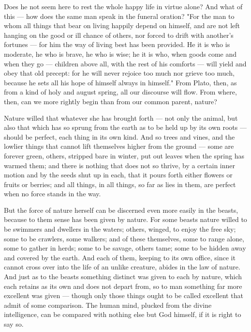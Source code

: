  Does he not seem here to rest the whole happy life in virtue alone? And what of this — how does the same man speak in the funeral oration? "For the man to whom all things that bear on living happily depend on himself, and are not left hanging on the good or ill chance of others, nor forced to drift with another's fortunes — for him the way of living best has been provided. He it is who is moderate, he who is brave, he who is wise; he it is who, when goods come and when they go — children above all, with the rest of his comforts — will yield and obey that old precept: for he will never rejoice too much nor grieve too much, because he sets all his hope of himself always in himself." From Plato, then, as from a kind of holy and august spring, all our discourse will flow. From where, then, can we more rightly begin than from our common parent, nature?

 Nature willed that whatever she has brought forth — not only the animal, but also that which has so sprung from the earth as to be held up by its own roots — should be perfect, each thing in its own kind. And so trees and vines, and the lowlier things that cannot lift themselves higher from the ground — some are forever green, others, stripped bare in winter, put out leaves when the spring has warmed them; and there is nothing that does not so thrive, by a certain inner motion and by the seeds shut up in each, that it pours forth either flowers or fruits or berries; and all things, in all things, so far as lies in them, are perfect when no force stands in the way.

 But the force of nature herself can be discerned even more easily in the beasts, because to them sense has been given by nature. For some beasts nature willed to be swimmers and dwellers in the waters; others, winged, to enjoy the free sky; some to be crawlers, some walkers; and of these themselves, some to range alone, some to gather in herds; some to be savage, others tame; some to be hidden away and covered by the earth. And each of them, keeping to its own office, since it cannot cross over into the life of an unlike creature, abides in the law of nature. And just as to the beasts something distinct was given to each by nature, which each retains as its own and does not depart from, so to man something far more excellent was given — though only those things ought to be called excellent that admit of some comparison. The human mind, plucked from the divine intelligence, can be compared with nothing else but God himself, if it is right to say so.

